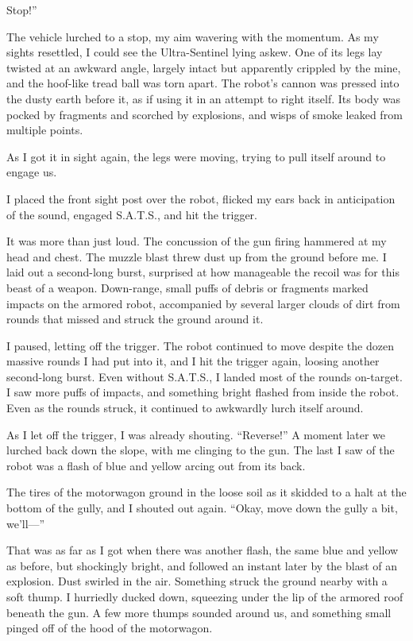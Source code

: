 \leavevmode{}Stop!”

The vehicle lurched to a stop, my aim wavering with the momentum. As my sights resettled, I could see the Ultra-Sentinel lying askew. One of its legs lay twisted at an awkward angle, largely intact but apparently crippled by the mine, and the hoof-like tread ball was torn apart. The robot’s cannon was pressed into the dusty earth before it, as if using it in an attempt to right itself. Its body was pocked by fragments and scorched by explosions, and wisps of smoke leaked from multiple points.

As I got it in sight again, the legs were moving, trying to pull itself around to engage us.

I placed the front sight post over the robot, flicked my ears back in anticipation of the sound, engaged S.A.T.S., and hit the trigger.

It was more than just loud. The concussion of the gun firing hammered at my head and chest. The muzzle blast threw dust up from the ground before me. I laid out a second-long burst, surprised at how manageable the recoil was for this beast of a weapon. Down-range, small puffs of debris or fragments marked impacts on the armored robot, accompanied by several larger clouds of dirt from rounds that missed and struck the ground around it.

I paused, letting off the trigger. The robot continued to move despite the dozen massive rounds I had put into it, and I hit the trigger again, loosing another second-long burst. Even without S.A.T.S., I landed most of the rounds on-target. I saw more puffs of impacts, and something bright flashed from inside the robot. Even as the rounds struck, it continued to awkwardly lurch itself around.

As I let off the trigger, I was already shouting. “Reverse!” A moment later we lurched back down the slope, with me clinging to the gun. The last I saw of the robot was a flash of blue and yellow arcing out from its back.

The tires of the motorwagon ground in the loose soil as it skidded to a halt at the bottom of the gully, and I shouted out again. “Okay, move down the gully a bit, we’ll—”

That was as far as I got when there was another flash, the same blue and yellow as before, but shockingly bright, and followed an instant later by the blast of an explosion. Dust swirled in the air. Something struck the ground nearby with a soft thump. I hurriedly ducked down, squeezing under the lip of the armored roof beneath the gun. A few more thumps sounded around us, and something small pinged off of the hood of the motorwagon.


